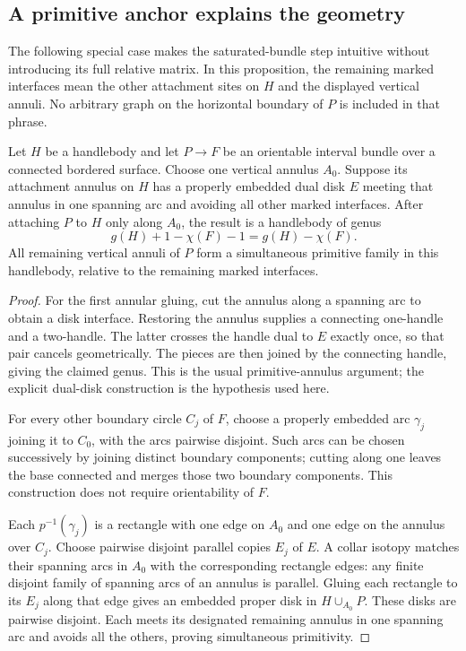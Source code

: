 \subsection{A primitive anchor explains the geometry}

The following special case makes the saturated-bundle step intuitive
without introducing its full relative matrix.
In this proposition, the remaining marked interfaces mean the other
attachment sites on $H$ and the displayed vertical annuli. No arbitrary
graph on the horizontal boundary of $P$ is included in that phrase.

\begin{proposition}
\label{prop:saturated-anchor}
Let $H$ be a handlebody and let $P\to F$ be an orientable interval bundle
over a connected bordered surface.  Choose one vertical annulus $A_0$.
Suppose its attachment annulus on $H$ has a properly embedded dual disk
$E$ meeting that annulus in one spanning arc and avoiding all other
marked interfaces.  After attaching $P$ to $H$ only along $A_0$, the
result is a handlebody of genus
\[
 g(H)+1-\chi(F)-1=g(H)-\chi(F).
\]
All remaining vertical annuli of $P$ form a simultaneous primitive
family in this handlebody, relative to the remaining marked interfaces.
\end{proposition}

\begin{proof}
For the first annular gluing, cut the annulus along a spanning arc to
obtain a disk interface. Restoring the annulus supplies a connecting
one-handle and a two-handle. The latter crosses the handle dual to $E$
exactly once, so that pair cancels geometrically. The pieces are then
joined by the connecting handle, giving the claimed genus. This is the
usual primitive-annulus argument\cite{schultens-weidmann}; the explicit
dual-disk construction is the hypothesis used here.

For every other boundary circle $C_j$ of $F$, choose a properly embedded
arc $\gamma_j$ joining it to $C_0$, with the arcs pairwise disjoint.
Such arcs can be chosen successively by joining distinct boundary
components; cutting along one leaves the base connected and merges
those two boundary components.  This construction does not require
orientability of $F$.

Each $p^{-1}(\gamma_j)$ is a rectangle with one edge on $A_0$ and one
edge on the annulus over $C_j$.  Choose pairwise disjoint parallel
copies $E_j$ of $E$.  A collar isotopy matches their spanning arcs in
$A_0$ with the corresponding rectangle edges: any finite disjoint
family of spanning arcs of an annulus is parallel.  Gluing each
rectangle to its $E_j$ along that edge gives an embedded proper disk
in $H\cup_{A_0}P$.  These disks are pairwise disjoint.  Each meets its
designated remaining annulus in one spanning arc and avoids all the
others, proving simultaneous primitivity.
\end{proof}

